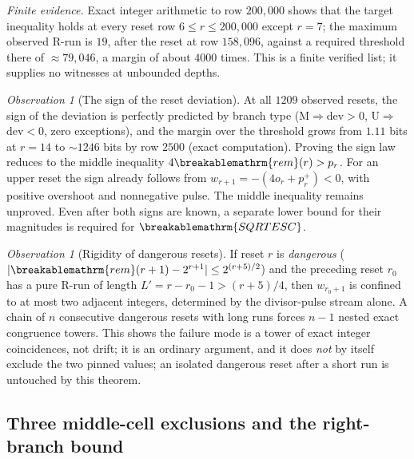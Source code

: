 \documentclass[11pt]{article}
\theoremstyle{plain}
\theoremstyle{definition}
\theoremstyle{remark}
\newtheorem{obs}[thm]{Observation}
\renewcommand{\mathrm}[1]{\ifmmode\breakablemathrm{#1}\else\textrm{#1}\fi}%
\begin{document}
\emph{Finite evidence.} Exact integer arithmetic to row $200{,}000$ shows that the
target inequality holds at every reset row $6\le r\le200{,}000$ except $r=7$; the maximum observed R-run is $19$, after
the reset at row $158{,}096$, against a required threshold there of $\approx79{,}046$, a margin of about
$4000$ times.  This is a finite verified list; it supplies no witnesses at unbounded depths.

\begin{obs}[The sign of the reset deviation]
At all $1209$ observed resets, the sign of the deviation is perfectly predicted by branch type
(M$\Rightarrow$dev$>0$, U$\Rightarrow$dev$<0$, zero exceptions), and the margin over the threshold
grows from $1.11$ bits at $r=14$ to $\sim1246$ bits by row $2500$ (exact computation). Proving the sign
law reduces to the middle inequality
$4\mathrm{rem}(r)>p_r$.  For an upper reset the sign already follows
from $w_{r+1}=-(4o_r+p_r^+)<0$, with positive overshoot and
nonnegative pulse.  The middle inequality remains unproved.
Even after both signs are known, a separate lower bound for their
magnitudes is required for $\mathrm{SQRTESC}$.
\end{obs}

\begin{obs}[Rigidity of dangerous resets]
\label{obs:dangerous-reset-rigidity}
If reset $r$ is \emph{dangerous} ($|\mathrm{rem}(r+1)-2^{r+1}|\le2^{(r+5)/2}$) and the preceding
reset $r_0$ has a pure R-run of length $L'=r-r_0-1>(r+5)/4$, then $w_{r_0+1}$ is confined to at
most two adjacent integers, determined by the divisor-pulse stream alone. A chain of $n$
consecutive dangerous resets with long runs forces $n-1$ nested exact congruence towers. This
shows the failure mode is a tower of exact integer coincidences, not drift; it is an ordinary
argument, and it does \emph{not} by itself exclude the two pinned values; an isolated dangerous reset after a
short run is untouched by this theorem.
\end{obs}

\subsection{Three middle-cell exclusions and the right-branch bound}
\end{document}
